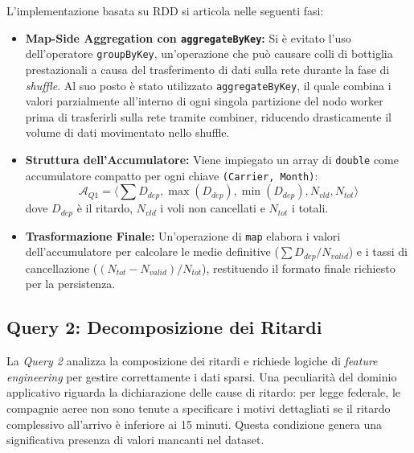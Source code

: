 \documentclass[conference]{IEEEtran}
\begin{document}
L'implementazione basata su RDD si articola nelle seguenti fasi:
\begin{itemize}
    \item \textbf{Map-Side Aggregation con \texttt{aggregateByKey}:} Si è evitato l'uso dell'operatore \texttt{groupByKey}, un'operazione che può causare colli di bottiglia prestazionali a causa del trasferimento di dati sulla rete durante la fase di \textit{shuffle}.
    Al suo posto è stato utilizzato \texttt{aggregateByKey}, il quale combina i valori parzialmente all'interno di ogni singola partizione del nodo worker prima di trasferirli sulla rete tramite combiner, riducendo drasticamente il volume di dati movimentato nello shuffle.
    \item \textbf{Struttura dell'Accumulatore:} Viene impiegato un array di \texttt{double} come accumulatore compatto per ogni chiave \texttt{(Carrier, Month)}:
    \[
    \mathcal{A}_{Q1} = \langle \textstyle \sum D_{dep}, \max(D_{dep}), \min(D_{dep}), N_{vld}, N_{tot} \rangle
    \]
    dove $D_{dep}$ è il ritardo, $N_{vld}$ i voli non cancellati e $N_{tot}$ i totali.
    \item \textbf{Trasformazione Finale:} Un'operazione di \texttt{map} elabora i valori dell'accumulatore per calcolare le medie definitive ($ \sum D_{dep} / N_{valid} $) e i tassi di cancellazione ($ (N_{tot} - N_{valid}) / N_{tot} $), restituendo il formato finale richiesto per la persistenza.
\end{itemize}

\subsection{Query 2: Decomposizione dei Ritardi}\label{subsec:query2_details}
La \textit{Query 2} analizza la composizione dei ritardi e richiede logiche di \textit{feature engineering} per gestire correttamente i dati sparsi.
Una peculiarità del dominio applicativo riguarda la dichiarazione delle cause di ritardo: per legge federale, le compagnie aeree non sono tenute a specificare i motivi dettagliati se il ritardo complessivo all'arrivo è inferiore ai 15 minuti.
Questa condizione genera una significativa presenza di valori mancanti nel dataset.
\end{document}
